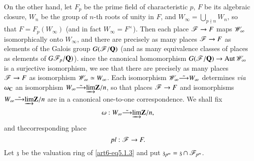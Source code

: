 On the other hand, let $F_p$ be the prime field of characteristic $p$, $F$ be its algebraic closure, $W_n$ be the group of $n$-th roots of unity in $F$, and $W_\infty = \bigcup\limits_{p \nmid n} W_n$, so that $F = F_p (W_\infty)$ (and in fact $W_\infty = F^\times$). Then each place $\mathscr{F} \to F$ maps $\mathscr{W}_\infty$ isomorphically onto $W_\infty$, and there are precisely as many places $\mathscr{F} \to F$ as elements of the Galois group $G (\mathscr{F}/ \mathbf{Q})$ (and as many equivalence classes of places as elements of $G\mathscr{F}_p/\mathbf{Q})$). since the canonical homomorphism $G(\mathscr{F}/\mathbf{Q}) \to \operatorname{Aut} \mathscr{W}_\infty$ is a surjective isomorphism, we see that there are precisely as many places $\mathscr{F}\to F$ as isomorphism $\mathscr{W}_\infty \simeq W_\infty$. Each isomorphism $\mathscr{W}_\infty \tilde{\longrightarrow} W_\infty$ determines \textit{via} $\omega_{\mathbf{C}}$ an isomorphism $W_\infty \tilde{\longrightarrow} \underrightarrow{\lim} \mathbf{Z} / n$, so that places $\mathscr{F} \to F$ and isomorphisms $W_\infty \tilde{\longrightarrow} \underrightarrow{\lim} \mathbf{Z}/n$ are in a canonical one-to-one correspondence. We shall fix
\begin{equation}
\omega : W_\infty  \tilde{\longrightarrow} \underrightarrow{\lim} \mathbf{Z}/ n,
\label{art6-eq5.1.2}
\end{equation}
and the\pageoriginale corresponding place
\begin{equation}
pl:  \mathscr{F} \to F. 
\label{art6-eq5.1.3}
\end{equation}
Let $\mathfrak{z}$ be the valuation ring of \eqref{art6-eq5.1.3} and put $\mathfrak{z}_{p^m} = \mathfrak{z} \cap \mathscr{F}_{p^m}$. 

